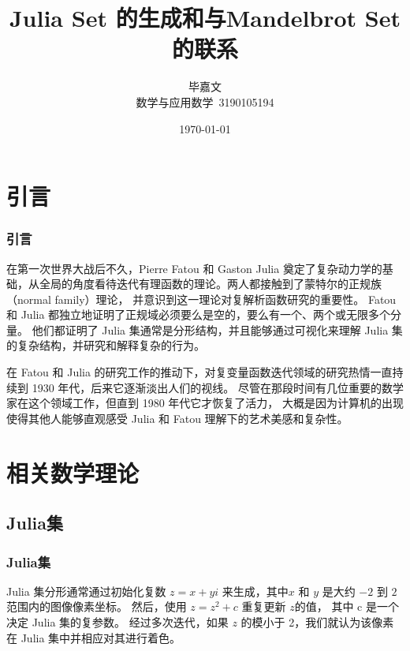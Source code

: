 \documentclass[11pt]{beamer}																										\usetheme{Madrid}
\begin{document}
	\title[Julia Set 的生成和与Mandelbrot Set的联系]{Julia Set 的生成和与Mandelbrot Set的联系}
	\author[毕嘉文 \\ 数学与应用数学\ 3190105194]{毕嘉文 \\ 数学与应用数学\ 3190105194} %
	\date{\today}
\begin{frame}
	\titlepage
\end{frame}
\section[Contents]{}


\frame {
	\frametitle{\secname}
	\tableofcontents
}
\section{引言}
\begin{frame}[fragile]
	\frametitle{引言}

	在第一次世界大战后不久，Pierre Fatou \cite{BSMF_1922__50__37_1,BSMF_1920__48__208_1} 和 Gaston Julia \cite{GastonJulia1918}
奠定了复杂动力学的基础，从全局的角度看待迭代有理函数的理论。两人都接触到了蒙特尔的正规族（normal family）理论，
并意识到这一理论对复解析函数研究的重要性。 Fatou 和 Julia 都独立地证明了正规域必须要么是空的，要么有一个、两个或无限多个分量。
他们都证明了 Julia 集通常是分形结构，并且能够通过可视化来理解 Julia 集的复杂结构，并研究和解释复杂的行为。


	在 Fatou 和 Julia 的研究工作的推动下，对复变量函数迭代领域的研究热情一直持续到 1930 年代，后来它逐渐淡出人们的视线。
尽管在那段时间有几位重要的数学家在这个领域工作，但直到 1980 年代它才恢复了活力，
大概是因为计算机的出现使得其他人能够直观感受 Julia 和 Fatou 理解下的艺术美感和复杂性。\cite{10.1007/978-3-319-08105-2_3}
\end{frame}

\section{相关数学理论}

\subsection{Julia集}
\begin{frame}[fragile]
	\frametitle{Julia集}
	Julia 集分形通常通过初始化复数 $z = x + yi$ 来生成，其中$x$ 和 $y$ 是大约 $-2$ 到 $2$ 范围内的图像像素坐标。
然后，使用 $z = z^2 + c$ 重复更新 $z $的值， 其中 c 是一个决定 Julia 集的复参数。 
经过多次迭代，如果 $z$ 的模小于 2，我们就认为该像素在 Julia 集中并相应对其进行着色。 
\end{frame}
\end{document}
